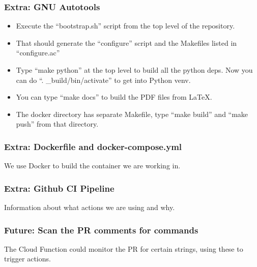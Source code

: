 \documentclass[aspectratio=169]{beamer}
\begin{document}
\begin{frame}
	\frametitle{Extra: GNU Autotools}
	\begin{itemize}
		\item Execute the ``bootstrap.sh'' script from the top level of the repository.
		\item That should generate the ``configure'' script and the Makefiles listed in ``configure.ac''
		\item Type ``make python'' at the top level to build all the python deps. Now you can do ``. \_build/bin/activate'' to get into Python venv.
		\item You can type ``make docs'' to build the PDF files from  LaTeX.
		\item The docker directory has separate Makefile, type ``make build'' and ``make push'' from that directory.
	\end{itemize}
	\vspace{2mm}
\end{frame}

\begin{frame}
	\frametitle{Extra: Dockerfile and docker-compose.yml}
	We use Docker to build the container we are working in.
\end{frame}

\begin{frame}
	\frametitle{Extra: Github CI Pipeline}
	Information about what actions we are using and why.
\end{frame}

\begin{frame}
	\frametitle{Future: Scan the PR comments for commands}
	The Cloud Function could monitor the PR for certain strings, using these to trigger actions.
\end{frame}
\end{document}

